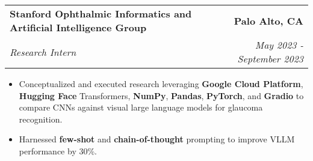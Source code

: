 \documentclass[letterpaper,11pt]{article}
\makeatletter
\newcommand{\resumeItem}[1]{
  \item\small{
    {#1 \vspace{-3pt}}
  }
}
\newcommand{\resumeSubheading}[4]{
  \vspace{-3pt}\item
    \begin{tabular*}{1.0\textwidth}[t]{l@{\extracolsep{\fill}}r}
      \textbf{#1} & \textbf{\small #2} \\
      \textit{\small#3} & \textit{\small #4} \\
    \end{tabular*}\vspace{-7pt}
}
\newcommand{\resumeSubheadingContinue}[2]{
  \vspace{-3pt}
    \begin{tabular*}{1.0\textwidth}[t]{l@{\extracolsep{\fill}}r}
      \textit{\small#1} & \textit{\small #2} \\
    \end{tabular*}\vspace{-7pt}
}
\newcommand{\resumeItemListStart}{\begin{itemize}}
\newcommand{\resumeItemListEnd}{\end{itemize}\vspace{0pt}}
\makeatother
\begin{document}

        \resumeSubheading
        {Stanford Ophthalmic Informatics and Artificial Intelligence Group}{Palo Alto, CA}
            {Research Intern}{May 2023 - September 2023}
            \resumeItemListStart
                \resumeItem{Conceptualized and executed research leveraging \textbf{Google Cloud Platform}, \textbf{Hugging Face} Transformers, \textbf{NumPy}, \textbf{Pandas}, \textbf{PyTorch}, and \textbf{Gradio} to compare CNNs against visual large language models for glaucoma recognition.}
                \resumeItem{Harnessed \textbf{few-shot} and \textbf{chain-of-thought} prompting to improve VLLM performance by 30\%.}
            \resumeItemListEnd
            
            

            
\end{document}
